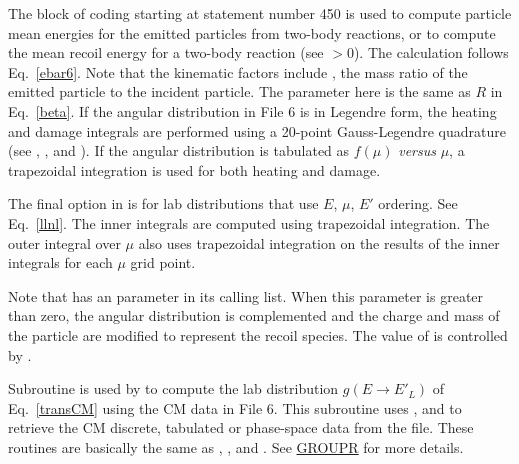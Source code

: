 The block of coding starting at statement number 450 is used to
compute particle mean energies for the emitted particles from
two-body reactions, or to compute the mean recoil energy for a
two-body reaction (see $>$0).  The calculation
follows Eq.~\ref{ebar6}.  Note that the kinematic factors
include , the mass ratio of the emitted particle to
the incident particle.  The parameter  here is
the same as $R$ in Eq.~\ref{beta}.  If the angular
distribution in File 6 is in Legendre form, the heating
and damage integrals are performed using a 20-point
Gauss-Legendre quadrature (see , ,
and ).  If the angular distribution is tabulated
as $f(\mu)$ {\it versus} $\mu$, a trapezoidal integration is used
for both heating and damage.

The final option in  is for lab distributions
that use $E$, $\mu$, $E'$ ordering.  See Eq.~\ref{llnl}.
The inner integrals are computed using trapezoidal integration.
The outer integral over $\mu$ also uses trapezoidal integration
on the results of the inner integrals for each $\mu$ grid point.

Note that  has an  parameter in its
calling list.  When this parameter is greater than zero, the
angular distribution is complemented and the charge and mass of
the particle are modified to represent the recoil species.
The value of  is controlled by .

Subroutine  is used by
 to compute the lab distribution
$g(E{\rightarrow}E'_L)$ of Eq.~\ref{transCM}
using the CM data in File 6.  This subroutine uses
,
 and
 to retrieve the CM discrete,
tabulated or phase-space data from the file.  These routines are
basically the same as ,
,
and .  See
\hyperlink{sGROUPRhy}{GROUPR} for more details.

